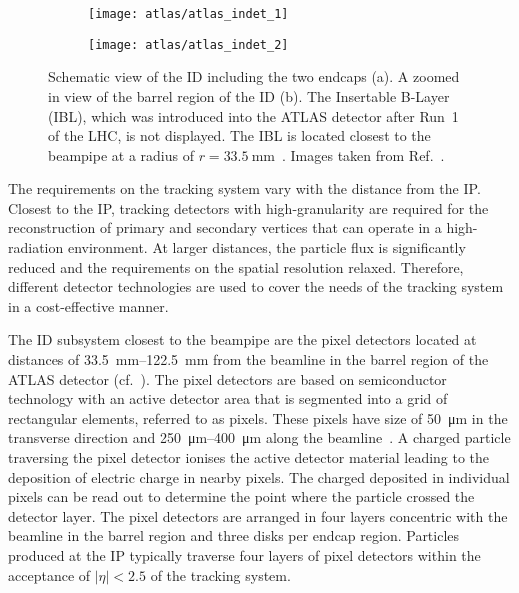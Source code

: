 \begin{figure}[htbp]

  \begin{subfigure}[b]{0.55\textwidth}
    \texttt{[image: atlas/atlas\_indet\_1]}%
    \subcaption{}
  \end{subfigure}\hfill%
  \begin{subfigure}[b]{0.45\textwidth}
    \texttt{[image: atlas/atlas\_indet\_2]}%
    \subcaption{}%
    \label{fig:indet_barrel}
  \end{subfigure}

  \caption{Schematic view of the ID including the two endcaps (a). A zoomed in
    view of the barrel region of the ID (b). The Insertable B-Layer (IBL), which
    was introduced into the ATLAS detector after Run~1 of the LHC, is not
    displayed. The IBL is located closest to the beampipe at a radius of
    $r = \SI{33.5}{\milli\metre}$~\cite{ATLAS-TDR-19,PIX-2018-001}. Images taken
    from Ref.~\cite{Pequenao:1095926}.}%
  \label{fig:atlas_inner_detector}
\end{figure}

The requirements on the tracking system vary with the distance from the IP.
Closest to the IP, tracking detectors with high-granularity are required for the
reconstruction of primary and secondary vertices that can operate in a
high-radiation environment. At larger distances, the particle flux is
significantly reduced and the requirements on the spatial resolution relaxed.
Therefore, different detector technologies are used to cover the needs of the
tracking system in a cost-effective manner.

The ID subsystem closest to the beampipe are the pixel detectors located at
distances of \SIrange{33.5}{122.5}{\milli\metre} from the beamline in the barrel
region of the ATLAS detector (cf.\ ). The pixel
detectors are based on semiconductor technology with an active detector area
that is segmented into a grid of rectangular elements, referred to as
pixels. These pixels have size of \SI{50}{\micro\metre} in the transverse
direction and \SIrange{250}{400}{\micro\metre} along the
beamline~\cite{PERF-2007-01,PIX-2018-001}. A charged particle traversing the
pixel detector ionises the active detector material leading to the deposition of
electric charge in nearby pixels. The charged deposited in individual pixels can
be read out to determine the point where the particle crossed the detector
layer. The pixel detectors are arranged in four layers concentric with the
beamline in the barrel region and three disks per endcap region. Particles
produced at the IP typically traverse four layers of pixel detectors within the
acceptance of $|\eta| < 2.5$ of the tracking system.

